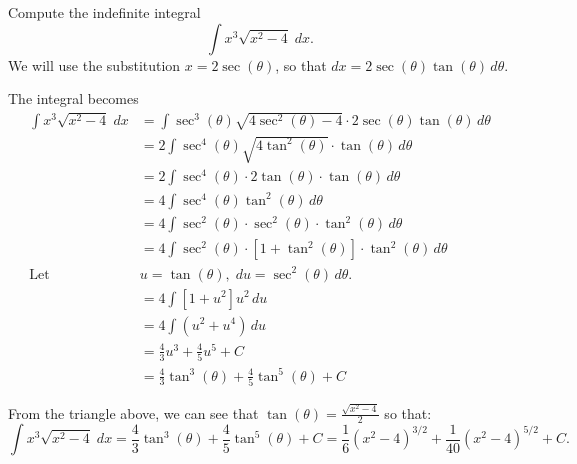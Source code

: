 \documentclass{ximera}
\begin{document}
\begin{example}[example 5]
Compute the indefinite integral
\[
\int x^3\sqrt{x^2-4} \; dx.
\]
We will use the substitution $x = 2\sec(\theta)$,
so that $dx = 2\sec(\theta)\tan(\theta) \, d\theta$.

The integral becomes
\begin{align*}
\int x^3\sqrt{x^2-4}\; dx &= \int \sec^3(\theta)\sqrt{4\sec^2(\theta)-4}\cdot 2\sec(\theta)\tan(\theta)\, d\theta\\[6pt]
                           &=  2\int \sec^4(\theta)\sqrt{4\tan^2(\theta)}\cdot \tan(\theta)\, d\theta\\[6pt]   
                            &=  2\int \sec^4(\theta)\cdot2\tan(\theta)\cdot \tan(\theta)\, d\theta\\[6pt] 
                            &=  4\int \sec^4(\theta)\tan^2(\theta)\, d\theta\\[6pt] 
                            &=  4\int \sec^2(\theta)\cdot \sec^2(\theta) \cdot \tan^2(\theta)\, d\theta\\[6pt]  
                            &=  4\int \sec^2(\theta)\cdot [1 + \tan^2(\theta)] \cdot \tan^2(\theta)\, d\theta\\[6pt]  
                            \text{Let } \; & u = \tan(\theta), \; du = \sec^2(\theta) \, d\theta.\\[6pt]
                            &=  4\int [1 + u^2]u^2\, du\\[6pt] 
                             &=  4\int (u^2 + u^4) \, du\\[6pt]
                             &= \frac43 u^3 + \frac45 u^5 + C\\[6pt]
                             &= \frac43 \tan^3(\theta) + \frac45 \tan^5(\theta) + C                            
\end{align*}




\begin{image}
\end{image}




From the triangle above, we can see that $\tan(\theta) = \frac{\sqrt{x^2-4}}{2}$ so that:
\[
\int x^3\sqrt{x^2-4} \; dx =  \frac43 \tan^3(\theta) + \frac45 \tan^5(\theta) + C =  \frac16 (x^2 - 4)^{3/2} + 
\frac{1}{40} (x^2 - 4)^{5/2} + C.
\]

\end{example}
\end{document}
